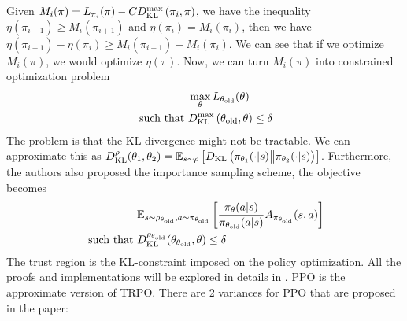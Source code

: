 Given $M_i(\pi) = L_{\pi_i}(\pi) - CD_{\mathrm{KL}}^{\max}\left( \pi_i, \pi \right)$, we have the inequality $\eta(\pi_{i+1}) \ge M_i(\pi_{i+1})$ and $\eta(\pi_i) = M_i(\pi_i)$, then we have $\eta(\pi_{i+1}) - \eta(\pi_i) \ge  M_i(\pi_{i+1}) - M_i(\pi_i)$. We can see that if we optimize $M_i(\pi)$, we would optimize $\eta(\pi)$. Now, we can turn $M_i(\pi)$ into constrained optimization problem 
\begin{equation}
\begin{aligned}
    &\max_\theta L_{\theta_\text{old}}(\theta) \\
    \text{ such that } &D_{\mathrm{KL}}^{\max}\left( \theta_{\text{old}}, \theta \right) \le \delta
\end{aligned}
\end{equation}
The problem is that the KL-divergence might not be tractable. We can approximate this as $D^\rho_{\text{KL}}(\theta_1, \theta_2) = \mathbb{E}_{s\sim\rho}\left[ D_{\mathrm{KL}}\left( \pi_{\theta_1}(\cdot | s) \big\| \pi_{\theta_2}(\cdot | s) \right) \right]$. Furthermore, the authors also proposed the importance sampling scheme, the objective becomes 
\begin{equation}
\begin{aligned}
    &\mathbb{E}_{s \sim \rho_{\theta_{\text{old}}}, a \sim \pi_{\theta_{\text{old}}}}\left[ \frac{\pi_\theta(a | s)}{\pi_{\theta_{\text{old}}}(a | s)} A_{\pi_{\theta_{\text{old}}}}(s, a) \right] \\
    \text{ such that }& D^{\rho_{\theta_\text{old}}}_{\text{KL}}(\theta_{\theta_\text{old}}, \theta) \le \delta
\end{aligned}
\end{equation}
The trust region is the KL-constraint imposed on the policy optimization. All the proofs and implementations will be explored in details in \cite{schulman2015trust}. PPO \cite{schulman2017proximal} is the approximate version of TRPO. There are 2 variances for PPO that are proposed in the paper:
